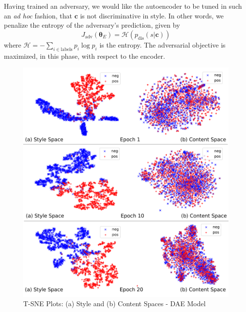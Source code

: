 \documentclass[11pt,a4paper]{article}
\begin{document}
Having trained an adversary, we would like the autoencoder to be tuned in such an \textit{ad hoc} fashion, that $\bm c$ is not discriminative in style. In other words, we penalize the entropy of the adversary's prediction, given by
\begin{equation}
	J_\text{adv}(\bm\theta_E)=\mathcal{H}(p_\text{dis}(s|\bm c))
\end{equation}
where $\mathcal{H}=-\sum_{i\in\text{labels}}p_i\log p_i$ is the entropy. The adversarial objective is maximized, in this phase, with respect to the encoder.

\begin{figure}[ht]
	\includegraphics[width=\linewidth]{latent-spaces-dae}
	\caption{T-SNE Plots: (a) Style and (b) Content Spaces - DAE Model}
	\label{fig:dae-tsne}
\end{figure}
\end{document}
